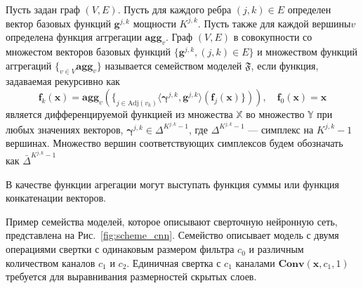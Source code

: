 \begin{defin}
Пусть задан граф $(V,E)$. Пусть для каждого ребра $(j,k) \in E$ определен вектор базовых функций $\mathbf{g}^{j,k}$ мощности $K^{j,k}$. Пусть также для каждой вершины$v$ определена функция аггрегации $\textbf{agg}_v$. Граф $(V, E)$ в совокупности со множестом векторов базовых функций $\{\mathbf{g}^{j,k}, (j,k) \in E\}$ и множеством функций аггрегаций $\{_{v \in V} \textbf{agg}_v\}$ называется семейством моделей $\mathfrak{F}$, если функция, задаваемая рекурсивно как 
\begin{equation}
\label{eq:modelfam}
    \mathbf{f}_k(\mathbf{x}) = \textbf{agg}_v\left(\{_{j \in \text{Adj}(v_k)} \langle \boldsymbol{\gamma}^{j,k}, \mathbf{g}^{j,k} \rangle \left(\mathbf{f}_j(\mathbf{x})\}\right)\right), \quad \mathbf{f}_0(\mathbf{x}) = \mathbf{x}
\end{equation}
является дифференцируемой функцией из множества $\mathbb{X}$ во множество $\mathbb{Y}$ при любых значениях векторов, $\boldsymbol{\gamma}^{j,k} \in \Delta^{K^{j,k}-1}$,
где $ \Delta^{K^{j,k}-1}$ --- симплекс на $K^{j,k}-1$ вершинах. Множество вершин соответствующих симплексов будем обозначать как $\bar{\Delta}^{K^{j,k}-1}$
\end{defin}

В качестве функции агрегации могут выступать функция суммы или функция конкатенации векторов.

Пример семейства моделей, которое описывают сверточную нейронную сеть, представлена на Рис.~\ref{fig:scheme_cnn}. Семейство описывает модель с двумя операциями свертки с одинаковым размером фильтра $c_0$ и различным количеством каналов $c_1$ и $c_2$. Единичная свертка с $c_1$ каналами $\textbf{Conv}(\mathbf{x}, c_1, 1)$ требуется для выравнивания размерностей скрытых слоев.




